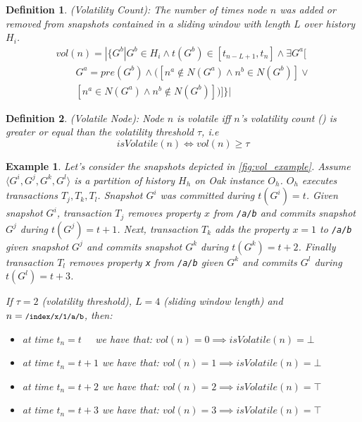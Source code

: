 \documentclass[abstracton,12pt]{scrreprt}
\newtheorem{definition}{Definition}
\newtheorem{example}{Example}
\begin{document}
\begin{definition}
    (Volatility Count): The number of times node $n$ was added or removed from snapshots contained in a sliding window with length $L$ over history $H_i$.
    \begin{equation}
        \begin{split}
            vol(n) = | \{ G^b | G^b \in H_i \land t(G^b) \in [t_{n-L+1}, t_n] \land \exists G^a[ \\
            \qquad G^a = pre(G^b) \land ([n^a \notin N(G^a) \land n^b \in N(G^b)]\lor \\
            \qquad [n^a \in N(G^a) \land n^b \notin N(G^b)] )]\} |
        \end{split}
    \end{equation}
    \label{def:vol_count}
\end{definition}

\begin{definition}
    (Volatile Node): Node $n$ is volatile iff $n$'s volatility count () is greater or equal than the volatility threshold $\tau$, i.e 
    $$ isVolatile(n) \iff vol(n) \geq \tau $$
\end{definition}

\begin{example}
    Let's consider the snapshots depicted in \cref{fig:vol_example}.
    Assume $\langle G^i,G^j,G^k,G^l \rangle$ is a partition of history $H_h$ on Oak instance $O_h$.
    $O_h$ executes transactions $T_j, T_k, T_l$. Snapshot $G^i$ was committed during $t(G^i) = t$.
    Given snapshot $G^i$, transaction $T_j$ removes property $x$ from \texttt{/a/b} and commits snapshot $G^j$ during $t(G^j) = t + 1$.
    Next, transaction $T_k$ adds the property $x=1$ to \texttt{/a/b} given snapshot $G^j$ and commits snapshot $G^k$ during $t(G^k) = t + 2$.
    Finally transaction $T_l$ removes property \texttt{x} from \texttt{/a/b} given $G^k$ and commits $G^l$ during $t(G^l) = t + 3$.
    
    If $\tau = 2$ (volatility threshold), $L = 4$ (sliding window length) and $n = \texttt{\footnotesize /index/x/1/a/b}$, then:
    \begin{itemize}
        \item at time $t_n = t$ \quad \ \ we have that: \quad $vol(n) = 0 \implies isVolatile(n) = \bot$
        \item at time $t_n = t + 1 $ we have that: \quad $ vol(n) = 1  \implies isVolatile(n) = \bot$
        \item at time $t_n = t + 2 $ we have that: \quad $ vol(n) = 2  \implies isVolatile(n) = \top$
        \item at time $t_n = t + 3 $ we have that: \quad $ vol(n) = 3  \implies isVolatile(n) = \top$
    \end{itemize}    
\end{example}
\end{document}

